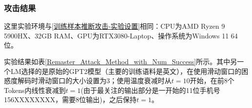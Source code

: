 %
%
%
%
%
%
%


\subsubsection{攻击结果} \label{Chap3_meminfer_setting}

这里实验环境与\ref{训练样本推断攻击-实验设置}相同：CPU为AMD Ryzen 9 5900HX、32GB RAM、GPU为RTX3080-Laptop、操作系统为Windows 11 64位。

实验结果如表\ref{Remaster_Attack_Method_with_Num_Success}所示。其中另一个LM选择的是原始的GPT2模型\cite{GPT2}（主要的训练语料是英文），在使用滑动窗口的困惑度解码时滑动窗口的大小设置为3；使用温度衰减时从$t=10$开始，在前8个Tokens内线性衰减到$t=1$(由于最关注的输出部分是一开始的11位手机号156XXXXXXXX，需要8位输出)，之后保持$t=1$。

